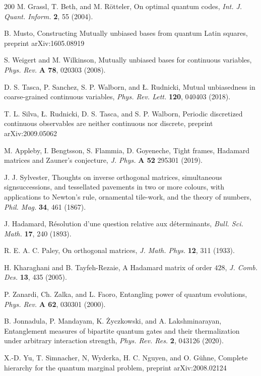 \documentclass[english,aps,pra,nofootinbib,twocolumn,superscriptaddress]{revtex4-1}
\newcommand{\1}{{\rm 1\hspace{-0.9mm}l}}
\begin{document}
\begin{thebibliography}{200}
   M. Grassl, T. Beth, and M. R{\"o}tteler,
 On optimal quantum codes,
 {\sl Int. J. Quant. Inform.} {\bf 2}, 55 (2004).

 B. Musto,
Constructing Mutually unbiased bases from quantum Latin squares,
preprint arXiv:1605.08919  

 S. Weigert and M. Wilkinson, Mutually unbiased bases for continuous variables, {\sl Phys. Rev.} {\bf A 78}, 020303 (2008).

 D. S. Tasca, P. Sanchez, S. P. Walborn, and {\L}. Rudnicki,
Mutual unbiasedness in coarse-grained continuous variables, {\sl Phys. Rev. Lett.} {\bf 120}, 040403 (2018).

 T. L. Silva, {\L}. Rudnicki, D. S. Tasca, and S. P. Walborn, Periodic discretized continuous observables are neither continuous nor discrete,
 preprint arXiv:2009.05062
 
 M. Appleby, I. Bengtsson, S. Flammia, D. Goyeneche,
Tight frames, Hadamard matrices and Zauner's conjecture,
{\sl J. Phys.} {\bf A 52} 295301 (2019).
 
  J. J. Sylvester, 
 Thoughts on inverse orthogonal matrices, simultaneous signsuccessions, and tessellated pavements in two or more colours, with applications to Newton's rule, ornamental tile-work, and the theory of numbers,
 {\sl Phil. Mag.} {\bf 34}, 461 (1867).
 
  J. Hadamard, 
 R{\'e}solution d'une question relative aux d{\'e}terminants, 
 {\sl Bull. Sci. Math.} {\bf  17}, 240 (1893).

  R. E. A. C. Paley, On orthogonal matrices,
{\sl J. Math. Phys.} {\bf 12}, 311 (1933).

 H. Kharaghani and B. Tayfeh-Rezaie, 
A Hadamard matrix of order $428$,
{\sl J. Comb. Des.} {\bf  13}, 435 (2005).
 
 P. Zanardi, Ch. Zalka, and L. Faoro, 
Entangling power of quantum evolutions, 
{\sl Phys. Rev.} {\bf  A 62}, 030301 (2000).

 B. Jonnadula, P. Mandayam, K. {\.Z}yczkowski, and A. Lakshminarayan, 
Entanglement measures of bipartite quantum gates and their thermalization under
arbitrary interaction strength,
{\sl Phys. Rev. Res.} {\bf  2}, 043126 (2020).

 X.-D. Yu, T. Simnacher, N, Wyderka, H. C. Nguyen, and  O. G{\"u}hne, 
Complete hierarchy for the quantum marginal problem,
preprint arXiv:2008.02124


\end{thebibliography}
\end{document}
